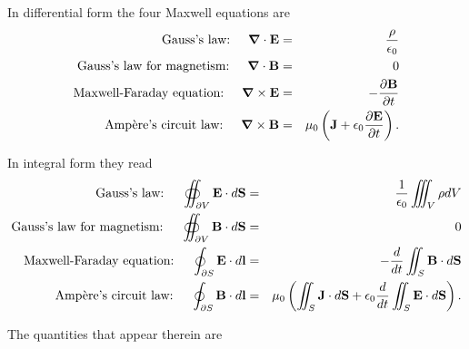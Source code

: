 \documentclass[11pt,oneside,a4paper]{article}
\begin{document}
In differential form the four Maxwell equations are
\begin{eqnarray}
\mbox{Gauss's law:}\hspace{0.5cm} \bm{\nabla}\cdot\mathbf{E}&=&\frac{\rho}{\epsilon_0}\nonumber\\
\mbox{Gauss's law for magnetism:}\hspace{0.5cm}  \bm{\nabla}\cdot\mathbf{B}&=&0\nonumber\\
\mbox{Maxwell-Faraday equation:}\hspace{0.5cm}  \bm{\nabla}\times\mathbf{E}&=&-\frac{\partial\mathbf{B}}{\partial t}\nonumber\\
\mbox{Amp\`ere's circuit law:}\hspace{0.5cm}  \bm{\nabla}\times\mathbf{B}&=&\mu_0\left(\mathbf{J}+\epsilon_0\frac{\partial\mathbf{E}}{\partial t}\right).\label{maxequ-diff}
\end{eqnarray}

In integral form they read
\begin{eqnarray}
\mbox{Gauss's law:}\hspace{0.5cm}  \oiint_{\partial V} \mathbf{E}\cdot d\mathbf{S}&=&\frac{1}{\epsilon_0}\iiint_V\rho dV\nonumber\\
\mbox{Gauss's law for magnetism:}\hspace{0.5cm}  \oiint_{\partial V} \mathbf{B}\cdot d\mathbf{S}&=&0\nonumber\\ 
\mbox{Maxwell-Faraday equation:}\hspace{0.5cm}  \oint_{\partial S} \mathbf{E}\cdot d\mathbf{l} &=&-\frac{d}{dt} \iint_S \mathbf{B}\cdot d\mathbf{S}\nonumber\\
\mbox{Amp\`ere's circuit law:}\hspace{0.5cm}  \oint_{\partial S} \mathbf{B}\cdot d\mathbf{l}&=&\mu_0\left(\iint_S \mathbf{J}\cdot d\mathbf{S} +\epsilon_0\frac{d}{dt}\iint_S \mathbf{E}\cdot d\mathbf{S}\right).\label{maxequ-int}
\end{eqnarray}

The quantities that appear therein are
\end{document}
